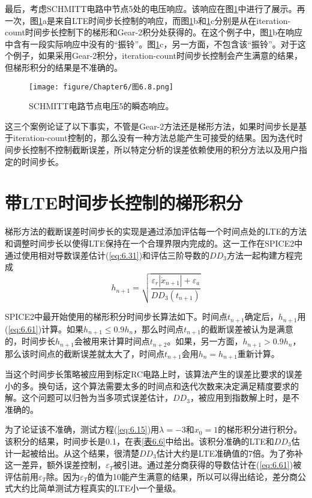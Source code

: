 最后，考虑SCHMITT电路中节点5处的电压响应。该响应在图\ref{图6.8}中进行了展示。再一次，图\ref{图6.8}a是来自LTE时间步长控制的响应，而图\ref{图6.8}b和\ref{图6.8}c分别是从在iteration-count时间步长控制下的梯形和Gear-2积分处获得的。在这个例子中，图\ref{图6.8}b在响应中含有一段实际响应中没有的“振铃”。图\ref{图6.8}c，另一方面，不包含该“振铃”。对于这个例子，如果采用Gear-2积分，iteration-count时间步长控制会产生满意的结果，但梯形积分的结果是不准确的。

\begin{figure}[htbp]
\small
    \centering
    \texttt{[image: figure/Chapter6/图6.8.png]}
    \caption{SCHMITT电路节点电压5的瞬态响应。}
    \label{图6.8}
\end{figure}

这三个案例论证了以下事实，不管是Gear-2方法还是梯形方法，如果时间步长是基于iteration-count控制的，那么没有一种方法总能产生可接受的结果。因为迭代时间步长控制不控制截断误差，所以特定分析的误差依赖使用的积分方法以及用户指定的时间步长。

\section{带LTE时间步长控制的梯形积分}
梯形方法的截断误差时间步长的实现是通过添加评估每一个时间点处的LTE的方法和调整时间步长以使得LTE保持在一个合理界限内完成的。这一工作在SPICE2中通过使用相对导数误差估计(\ref{eq:6.31})和评估三阶导数的$DD_3$方法一起构建方程完成
\begin{equation}
    h_{n+1} = \sqrt{\frac{\varepsilon_r|\dot{x}_{n+1}|+\varepsilon_a}{DD_3(t_{n+1})}}
    \label{eq:6.61}
\end{equation}

SPICE2中最开始使用的梯形积分时间步长算法如下。时间点$t_{n+1}$确定后，$h_{n+1}$用(\ref{eq:6.61})计算。如果$h_{n+1} \leq 0.9h_n$，那么时间点$t_{n+1}$的截断误差被认为是满意的，时间步长$h_{n+1}$会被用来计算时间点$t_{n+2}$。如果，另一方面，$h_{n+1} > 0.9h_n$，那么该时间点的截断误差就太大了，时间点$t_{n+1}$会用$h_n = h_{n+1}$重新计算。

当这个时间步长策略被应用到标定RC电路上时，该算法产生的误差比要求的误差小的多。换句话，这个算法需要太多的时间点和迭代次数来决定满足精度要求的解。这个问题可以归咎为当多项式误差估计，$DD_3$，被应用到指数解上时，是不准确的。

为了论证该不准确，测试方程(\ref{eq:6.15})用$\lambda = -3$和$x_0 = 1$的梯形积分进行积分。该积分的结果，时间步长是0.1，在表\ref{表6.6}中给出。该积分准确的LTE和$DD_3$估计一起被给出。从这个结果，很清楚$DD_3$估计大约是LTE准确值的7倍。为了弥补这一差异，额外误差控制，$\varepsilon_T$被引进。通过差分商获得的导数估计在(\ref{eq:6.61})被评估前用$\varepsilon_T$除。因为$\varepsilon_T$的值为10能产生满意的结果，所以可以得出结论，差分商公式大约比简单测试方程真实的LTE小一个量级。

